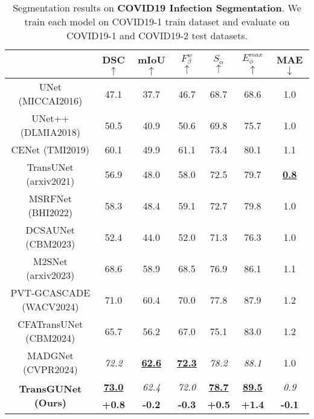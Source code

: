 \begin{table}[h]
\begin{tabular}{c|cccccc}
     & DSC \scriptsize{$\uparrow$} & mIoU \scriptsize{$\uparrow$} & $F_{\beta}^{w}$ \scriptsize{$\uparrow$}  & $S_{\alpha}$ \scriptsize{$\uparrow$} & $E_{\phi}^{max}$ \scriptsize{$\uparrow$} & MAE \scriptsize{$\downarrow$} \\
     \hline
     UNet \tiny{(MICCAI2016)}       & 47.1 & 37.7 & 46.7 & 68.7 & 68.6 & 1.0 \\
     UNet++ \tiny{(DLMIA2018)}      & 50.5 & 40.9 & 50.6 & 69.8 & 75.7 & 1.0 \\
     CENet \tiny{(TMI2019)}         & 60.1 & 49.9 & 61.1 & 73.4 & 80.1 & 1.1 \\
     TransUNet \tiny{(arxiv2021)}   & 56.9 & 48.0 & 58.0 & 72.5 & 79.7 & \textbf{\underline{0.8}} \\
     MSRFNet \tiny{(BHI2022)}       & 58.3 & 48.4 & 59.1 & 72.7 & 79.8 & 1.0 \\
     DCSAUNet \tiny{(CBM2023)}      & 52.4 & 44.0 & 52.0 & 71.3 & 76.3 & 1.0 \\
     M2SNet \tiny{(arxiv2023)}      & 68.6 & 58.9 & 68.5 & 76.9 & 86.1 & 1.1 \\
     PVT-GCASCADE \tiny{(WACV2024)} & 71.0 & 60.4 & 70.0 & 77.8 & 87.9 & 1.2 \\
     CFATransUNet \tiny{(CBM2024)}  & 65.7 & 56.2 & 67.0 & 75.1 & 83.0 & 1.2 \\
     MADGNet \tiny{(CVPR2024)}      & \textit{72.2} & \textbf{\underline{62.6}} & \textbf{\underline{72.3}} & \textit{78.2} & \textit{88.1} & 1.0 \\
     \hline
     \multicolumn{1}{c|}{\multirow{2}{*}{\textbf{TransGUNet \tiny{(Ours)}}}}     & \textbf{\underline{73.0}} & \textit{62.4} & \textit{72.0} & \textbf{\underline{78.7}} & \textbf{\underline{89.5}} & \textit{0.9} \\ \cline{2-7}
     & \textbf{+0.8} & \textbf{-0.2} & \textbf{-0.3} & \textbf{+0.5} & \textbf{+1.4} & \textbf{-0.1} \\
    \hline
    \end{tabular}
    \caption{Segmentation results on \textbf{COVID19 Infection Segmentation}. We train each model on COVID19-1 \cite{ma_jun_2020_3757476} train dataset and evaluate on COVID19-1 \cite{ma_jun_2020_3757476} and COVID19-2 test datasets.}
    \label{tab:comparison_sota_radiology_other_metrics}
\end{table}

